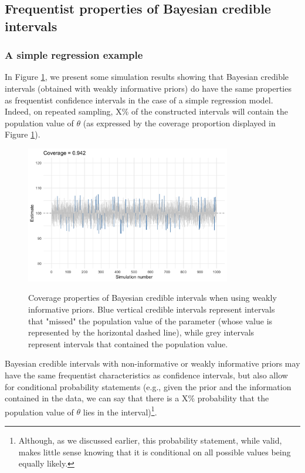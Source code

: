 \documentclass[a4paper,man,natbib,floatsintext,donotrepeattitle]{apa6}
\begin{document}
\subsection{Frequentist properties of Bayesian credible intervals}

\subsubsection{A simple regression example}

In Figure \ref{fig:coverage}, we present some simulation results showing that Bayesian credible intervals (obtained with weakly informative priors) do have the same properties as frequentist confidence intervals in the case of a simple regression model. Indeed, on repeated sampling, X\% of the constructed intervals will contain the population value of $\theta$ (as expressed by the coverage proportion displayed in Figure \ref{fig:coverage}).

\begin{figure}[H]
  \caption{Coverage properties of Bayesian credible intervals when using weakly informative priors. Blue vertical credible intervals represent intervals that "missed" the population value of the parameter (whose value is represented by the horizontal dashed line), while grey intervals represent intervals that contained the population value.}
  \centering
  \includegraphics[width=0.8\textwidth]{coverage1.png}
  \label{fig:coverage}
\end{figure}

Bayesian credible intervals with non-informative or weakly informative priors may have the same frequentist characteristics as confidence intervals, but also allow for conditional probability statements (e.g., given the prior and the information contained in the data, we can say that there is a X\% probability that the population value of $\theta$ lies in the interval)\footnote{Although, as we discussed earlier, this probability statement, while valid, makes little sense knowing that it is conditional on all possible values being equally likely.}.
\end{document}
